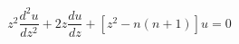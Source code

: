 \documentclass[12pt]{article}
\begin{document}
\begin{displaymath}
z^2\frac{d^2u}{dz^2} + 2z\frac{du}{dz} + [z^2 - n(n+1)]u = 0
\end{displaymath}
\end{document}
